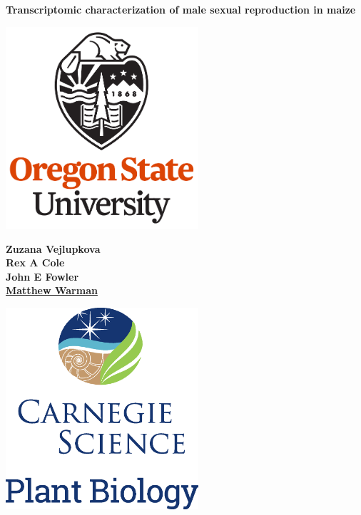 \documentclass[a0,30pt]{sciposter}
\begin{document}


\textbf{\color{CarnegiePriBlue} \fontsize{72}{12}\selectfont Transcriptomic characterization of male sexual reproduction in maize}

\begin{minipage}[m]{0.12\linewidth}
  \includegraphics[height=75mm]{oregon-state-vert.png}
\end{minipage}
\begin{minipage}[m]{0.25\linewidth}
  \color{Black}
  \Large
  \textbf{Zuzana Vejlupkova \\ Rex A Cole \\ John E Fowler \\ \underline{Matthew Warman}}
  \hfill
\end{minipage}
\begin{minipage}[m]{0.12\linewidth}
  \includegraphics[height=75mm]{CS_plantbio_logo_vert.eps}
\end{minipage}
\end{document}
